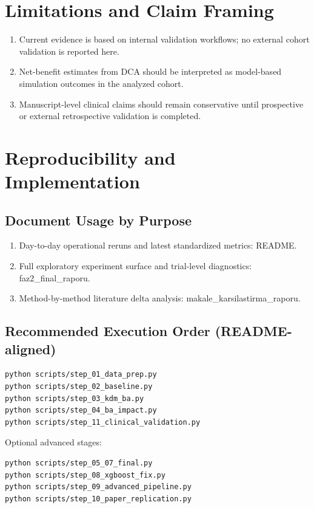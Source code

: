 ﻿\documentclass[11pt,a4paper]{article}
\begin{document}
\section{Limitations and Claim Framing}

\begin{enumerate}
  \item Current evidence is based on internal validation workflows; no external cohort validation is reported here.
  \item Net-benefit estimates from DCA should be interpreted as model-based simulation outcomes in the analyzed cohort.
  \item Manuscript-level clinical claims should remain conservative until prospective or external retrospective validation is completed.
\end{enumerate}

\section{Reproducibility and Implementation}

\subsection{Document Usage by Purpose}

\begin{enumerate}
  \item Day-to-day operational reruns and latest standardized metrics: README.
  \item Full exploratory experiment surface and trial-level diagnostics: faz2\_final\_raporu.
  \item Method-by-method literature delta analysis: makale\_karsilastirma\_raporu.
\end{enumerate}

\subsection{Recommended Execution Order (README-aligned)}

\begin{verbatim}
python scripts/step_01_data_prep.py
python scripts/step_02_baseline.py
python scripts/step_03_kdm_ba.py
python scripts/step_04_ba_impact.py
python scripts/step_11_clinical_validation.py
\end{verbatim}

Optional advanced stages:

\begin{verbatim}
python scripts/step_05_07_final.py
python scripts/step_08_xgboost_fix.py
python scripts/step_09_advanced_pipeline.py
python scripts/step_10_paper_replication.py
\end{verbatim}
\end{document}

